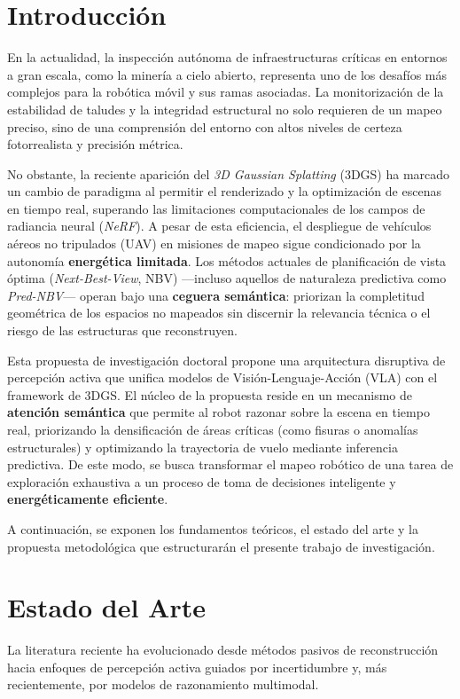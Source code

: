 \documentclass[12pt,a4paper]{article}
\begin{document}
	\section{Introducción}
	\label{sec:intro}
	
	En la actualidad, la inspección autónoma de infraestructuras críticas en entornos a gran escala, como la minería a cielo abierto, representa uno de los desafíos más complejos para la robótica móvil y sus ramas asociadas. La monitorización de la estabilidad de taludes y la integridad estructural no solo requieren de un mapeo preciso, sino de una comprensión del entorno con altos niveles de certeza fotorrealista y precisión métrica.
	
	No obstante, la reciente aparición del \textit{3D Gaussian Splatting} (3DGS) ha marcado un cambio de paradigma al permitir el renderizado y la optimización de escenas en tiempo real, superando las limitaciones computacionales de los campos de radiancia neural (\textit{NeRF}). A pesar de esta eficiencia, el despliegue de vehículos aéreos no tripulados (UAV) en misiones de mapeo sigue condicionado por la autonomía \textbf{energética limitada}. Los métodos actuales de planificación de vista óptima (\textit{Next-Best-View}, NBV) —incluso aquellos de naturaleza predictiva como \textit{Pred-NBV}— operan bajo una \textbf{ceguera semántica}: priorizan la completitud geométrica de los espacios no mapeados sin discernir la relevancia técnica o el riesgo de las estructuras que reconstruyen.
	
	Esta propuesta de investigación doctoral propone una arquitectura disruptiva de percepción activa que unifica modelos de Visión-Lenguaje-Acción (VLA) con el framework de 3DGS. El núcleo de la propuesta reside en un mecanismo de \textbf{atención semántica} que permite al robot razonar sobre la escena en tiempo real, priorizando la densificación de áreas críticas (como fisuras o anomalías estructurales) y optimizando la trayectoria de vuelo mediante inferencia predictiva. De este modo, se busca transformar el mapeo robótico de una tarea de exploración exhaustiva a un proceso de toma de decisiones inteligente y \textbf{energéticamente eficiente}.
	
	A continuación, se exponen los fundamentos teóricos, el estado del arte y la propuesta metodológica que estructurarán el presente trabajo de investigación.
	
	
	
	
	\section{Estado del Arte}
	\label{sec:estado_arte}
	La literatura reciente ha evolucionado desde métodos pasivos de reconstrucción hacia enfoques de percepción activa guiados por incertidumbre y, más recientemente, por modelos de razonamiento multimodal.
	
\end{document}
